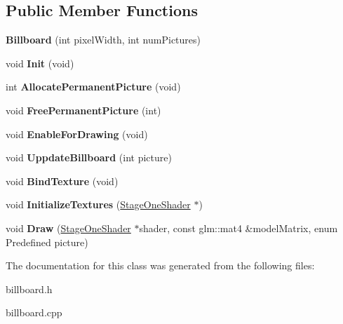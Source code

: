 \subsection*{\-Public \-Member \-Functions}
\begin{DoxyCompactItemize}
\item 
\hypertarget{classBillboard_a686db9e640bb05fea7870b5ac1d58ffd}{{\bfseries \-Billboard} (int pixel\-Width, int num\-Pictures)}\label{classBillboard_a686db9e640bb05fea7870b5ac1d58ffd}

\item 
\hypertarget{classBillboard_a255cb4eca326ca09b3159f34498c9ac4}{void {\bfseries \-Init} (void)}\label{classBillboard_a255cb4eca326ca09b3159f34498c9ac4}

\item 
\hypertarget{classBillboard_adbe4018f6ba4d825aca779e92f491a11}{int {\bfseries \-Allocate\-Permanent\-Picture} (void)}\label{classBillboard_adbe4018f6ba4d825aca779e92f491a11}

\item 
\hypertarget{classBillboard_a328e66ea7f8dc681e111756ac64beb22}{void {\bfseries \-Free\-Permanent\-Picture} (int)}\label{classBillboard_a328e66ea7f8dc681e111756ac64beb22}

\item 
\hypertarget{classBillboard_a8b4f58d90b1e4369605a07264a237d13}{void {\bfseries \-Enable\-For\-Drawing} (void)}\label{classBillboard_a8b4f58d90b1e4369605a07264a237d13}

\item 
\hypertarget{classBillboard_aa4978a8447c54f86a5907a1854a6cbf0}{void {\bfseries \-Uppdate\-Billboard} (int picture)}\label{classBillboard_aa4978a8447c54f86a5907a1854a6cbf0}

\item 
\hypertarget{classBillboard_aaaf1384dce2e354aa03275e125860cda}{void {\bfseries \-Bind\-Texture} (void)}\label{classBillboard_aaaf1384dce2e354aa03275e125860cda}

\item 
\hypertarget{classBillboard_a2e1dd4f1832fe6a0be6c6e3eb41d039d}{void {\bfseries \-Initialize\-Textures} (\hyperlink{classStageOneShader}{\-Stage\-One\-Shader} $\ast$)}\label{classBillboard_a2e1dd4f1832fe6a0be6c6e3eb41d039d}

\item 
\hypertarget{classBillboard_afda9fa2e0e2452d630e488128c7b38b1}{void {\bfseries \-Draw} (\hyperlink{classStageOneShader}{\-Stage\-One\-Shader} $\ast$shader, const glm\-::mat4 \&model\-Matrix, enum \-Predefined picture)}\label{classBillboard_afda9fa2e0e2452d630e488128c7b38b1}

\end{DoxyCompactItemize}


\-The documentation for this class was generated from the following files\-:\begin{DoxyCompactItemize}
\item 
billboard.\-h\item 
billboard.\-cpp\end{DoxyCompactItemize}
